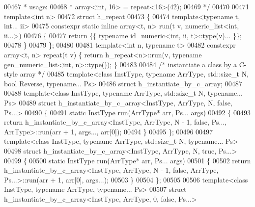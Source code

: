 \begin{DoxyCode}
00467 \textcolor{comment}{ * usage:}
00468 \textcolor{comment}{ *   array<int, 16> = repeat<16>(42);}
00469 \textcolor{comment}{ */}
00470 
00471 \textcolor{keyword}{template}<\textcolor{keywordtype}{int} n>
00472 \textcolor{keyword}{struct }h\_repeat
00473 \{
00474   \textcolor{keyword}{template}<\textcolor{keyword}{typename} t, \textcolor{keywordtype}{int}... ii>
00475   constexpr \textcolor{keyword}{static} \textcolor{keyword}{inline} array<t, n> run(t v, numeric\_list<int, ii...>)
00476   \{
00477     \textcolor{keywordflow}{return} \{\{ \textcolor{keyword}{typename} id\_numeric<int, ii, t>::type(v)... \}\};
00478   \}
00479 \};
00480 
00481 \textcolor{keyword}{template}<\textcolor{keywordtype}{int} n, \textcolor{keyword}{typename} t>
00482 constexpr array<t, n> repeat(t v) \{ \textcolor{keywordflow}{return} h\_repeat<n>::run(v, \textcolor{keyword}{typename} gen\_numeric\_list<int, n>::type()); 
      \}
00483 
00484 \textcolor{comment}{/* instantiate a class by a C-style array */}
00485 \textcolor{keyword}{template}<\textcolor{keyword}{class }InstType, \textcolor{keyword}{typename} ArrType, std::size\_t N, \textcolor{keywordtype}{bool} Reverse, \textcolor{keyword}{typename}... Ps>
00486 \textcolor{keyword}{struct }h\_instantiate\_by\_c\_array;
00487 
00488 \textcolor{keyword}{template}<\textcolor{keyword}{class }InstType, \textcolor{keyword}{typename} ArrType, std::size\_t N, \textcolor{keyword}{typename}... Ps>
00489 \textcolor{keyword}{struct }h\_instantiate\_by\_c\_array<InstType, ArrType, N, false, Ps...>
00490 \{
00491   \textcolor{keyword}{static} InstType run(ArrType* arr, Ps... args)
00492   \{
00493     \textcolor{keywordflow}{return} h\_instantiate\_by\_c\_array<InstType, ArrType, N - 1, false, Ps..., ArrType>::run(arr + 1, args...,
       arr[0]);
00494   \}
00495 \};
00496 
00497 \textcolor{keyword}{template}<\textcolor{keyword}{class }InstType, \textcolor{keyword}{typename} ArrType, std::size\_t N, \textcolor{keyword}{typename}... Ps>
00498 \textcolor{keyword}{struct }h\_instantiate\_by\_c\_array<InstType, ArrType, N, true, Ps...>
00499 \{
00500   \textcolor{keyword}{static} InstType run(ArrType* arr, Ps... args)
00501   \{
00502     \textcolor{keywordflow}{return} h\_instantiate\_by\_c\_array<InstType, ArrType, N - 1, false, ArrType, Ps...>::run(arr + 1, arr[0], 
      args...);
00503   \}
00504 \};
00505 
00506 \textcolor{keyword}{template}<\textcolor{keyword}{class }InstType, \textcolor{keyword}{typename} ArrType, \textcolor{keyword}{typename}... Ps>
00507 \textcolor{keyword}{struct }h\_instantiate\_by\_c\_array<InstType, ArrType, 0, false, Ps...>

\end{DoxyCode}
